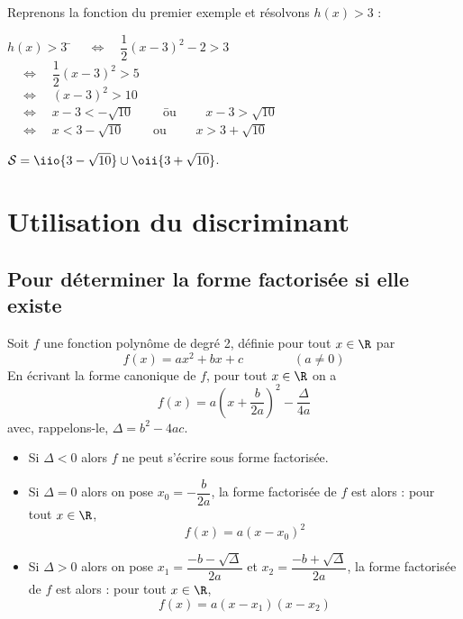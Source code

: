 \documentclass[a4paper,11pt,cours]{nsi}
\begin{document}
\begin{exemple}[\ 2]
	Reprenons la fonction du premier exemple et résolvons $h(x)>3$ :
	\begin{tabbing}
		$h(x)>3$	\= 	$\quad\Leftrightarrow\quad \dfrac{1}{2}(x-3)^2-2>3$	\\[0.5em]
		\>	$\quad\Leftrightarrow\quad \dfrac{1}{2}(x-3)^2>5$	\\[0.5em]
		\>	$\quad\Leftrightarrow\quad (x-3)^2>10$	\\
		\>	$\quad\Leftrightarrow\quad x-3<-\sqrt{10}\qquad$ \= ou	$\qquad x-3>\sqrt{10}$ \\
		\>	$\quad\Leftrightarrow\quad x<3-\sqrt{10}\qquad$ \> ou	$\qquad x>3+\sqrt{10}$ \\
	\end{tabbing}
	$\mathcal{S}=\iio{3-\sqrt{10}}\cup\oii{3+\sqrt{10}}$.\\
\end{exemple}


\section{Utilisation du discriminant}
\subsection{Pour déterminer la forme factorisée si elle existe}
\begin{propriete}
	Soit $f$ une fonction polynôme de degré 2, définie pour tout $x\in\R$ par
	$$f(x)=ax^2+bx+c\qquad\qquad(a\neq 0)$$
	En écrivant la forme canonique de $f$, pour tout $x\in\R$ on a
	$$f(x)=a\left(x+\dfrac{b}{2a}\right)^2-\dfrac{\Delta}{4a}$$
	avec, rappelons-le, $\Delta=b^2-4ac$.
	\begin{itemize}
		\item	Si $\Delta<0$ alors $f$ ne peut s'écrire sous forme factorisée.
		\item 	Si $\Delta=0$ alors on pose {\boldmath$x_0=-\dfrac{b}{2a}$}, la forme factorisée de $f$ est alors : pour tout $x\in\R$,
		{\boldmath$$f(x)=a(x-x_0)^2$$}
		\item 	Si $\Delta>0$ alors on pose {\boldmath $x_1=\dfrac{-b-\sqrt{\Delta}}{2a}$ et $x_2=\dfrac{-b+\sqrt{\Delta}}{2a}$}, 
		la forme factorisée de $f$ est alors : pour tout $x\in\R$,
		{\boldmath $$f(x)=a(x-x_1)(x-x_2)$$}
	\end{itemize}
\end{propriete}
\begin{demonstration}
\end{demonstration}
\end{document}

